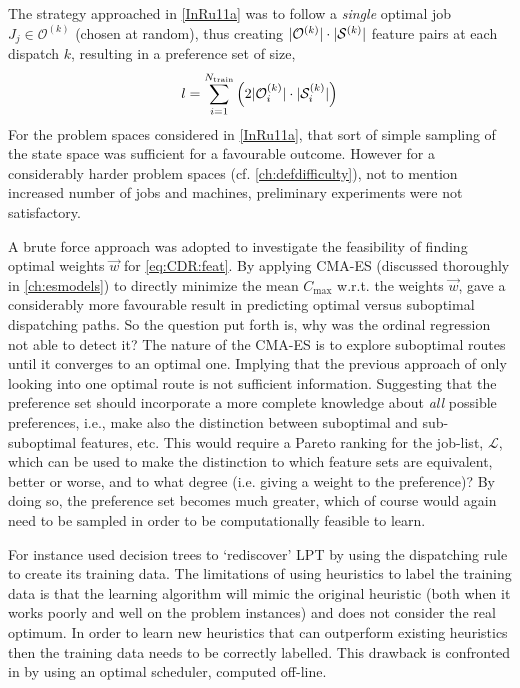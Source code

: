 The strategy approached in  \cref{InRu11a} was to follow a \emph{single} 
optimal job $J_j\in\mathcal{O}^{(k)}$ (chosen at random), thus creating 
$\lvert\mathcal{O}^{(k)}\rvert\cdot\lvert\mathcal{S}^{(k)}\rvert$ feature pairs at each 
dispatch $k$, resulting in a preference set of size,
\begin{equation}\label{eq:sizePsi_b}
l =  \sum_{i=1}^{N_{\text{train}}} \left(2 \abs{\mathcal{O}^{(k)}_i}\cdot 
\abs{\mathcal{S}^{(k)}_i} \right)
\end{equation}
For the problem spaces considered in \cref{InRu11a}, that sort of simple 
sampling of the state space was sufficient for a favourable outcome. 
However for a considerably harder problem spaces (cf. \cref{ch:defdifficulty}), 
not to mention increased number of jobs and machines, preliminary experiments 
were not satisfactory. 

A brute force approach was adopted to investigate the feasibility of finding 
optimal weights $\vec{w}$ for \cref{eq:CDR:feat}. 
By applying CMA-ES (discussed thoroughly in \cref{ch:esmodels}) to directly 
minimize the mean $C_{\max}$  w.r.t. the weights $\vec{w}$, gave a considerably 
more favourable result in predicting optimal versus suboptimal dispatching 
paths. 
So the question put forth is, why was the ordinal regression not able to detect 
it?
The nature of the CMA-ES is to explore suboptimal routes until it converges to 
an optimal one. 
Implying that the previous approach of only looking into one optimal route is 
not sufficient information. 
Suggesting that the preference set should incorporate a more complete knowledge 
about \emph{all} possible preferences, i.e., make also the distinction between 
suboptimal and sub-suboptimal features, etc.  
This would require a Pareto ranking for the job-list, $\mathcal{L}$, which can 
be used to make the distinction to which feature sets are equivalent, better or 
worse, and to what degree (i.e. giving a weight to the preference)? 
By doing so, the preference set becomes much greater, which of course would 
again need to be sampled in order to be computationally feasible to learn. 

For instance \cite{Siggi05} used decision trees to `rediscover' LPT by using 
the dispatching rule to create its training data. The limitations of using 
heuristics to label the training data is that the learning algorithm will mimic 
the original heuristic (both when it works poorly and well on the problem 
instances) and does not consider the real optimum. In order to learn new 
heuristics that can outperform existing heuristics then the training data needs 
to be correctly labelled. This drawback is confronted in 
\citep{Malik08,Russell09,Siggi10} by using an optimal scheduler, computed 
off-line. 

